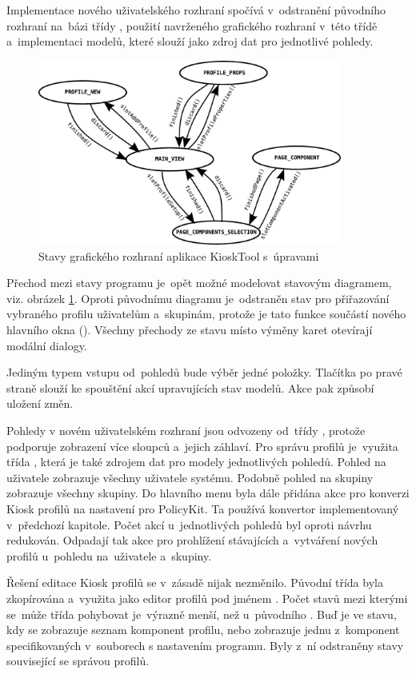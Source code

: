 Implementace nového uživatelského rozhraní spočívá v~odstranění původního rozhraní na~bázi třídy , použití navrženého grafického rozhraní v~této třídě a~implementaci modelů, které slouží jako zdroj dat pro jednotlivé pohledy.

\begin{figure}[h]
    \centering
    \includegraphics[width=10cm]{obrazky/stated-new.pdf}
    \caption{Stavy grafického rozhraní aplikace KioskTool s~úpravami}
    \label{fig:kioskstatesnew}
\end{figure}

Přechod mezi stavy programu je~opět možné modelovat stavovým diagramem, viz. obrázek \ref{fig:kioskstatesnew}. Oproti původnímu diagramu je~odstraněn stav pro přiřazování vybraného profilu uživatelům a~skupinám, protože je tato funkce součástí nového hlavního okna (). Všechny přechody ze stavu  místo výměny karet otevírají modální dialogy.

Jediným typem vstupu od~pohledů bude výběr jedné položky. Tlačítka po pravé straně slouží ke spouštění akcí upravujících stav modelů. Akce  pak způsobí uložení změn.

Pohledy v novém uživatelském rozhraní jsou odvozeny od~třídy , protože podporuje zobrazení více sloupců a~jejich záhlaví. Pro správu profilů je~využita třída , která je také zdrojem dat pro modely jednotlivých pohledů. Pohled na uživatele zobrazuje všechny uživatele systému. Podobně pohled na skupiny zobrazuje všechny skupiny. Do hlavního menu byla dále přidána akce pro konverzi Kiosk profilů na nastavení pro PolicyKit. Ta používá konvertor implementovaný v~předchozí kapitole. Počet akcí u~jednotlivých pohledů byl oproti návrhu redukován. Odpadají tak akce pro prohlížení stávajících a~vytváření nových profilů u~pohledu na~uživatele a~skupiny.

Řešení editace Kiosk profilů se v~zásadě nijak nezměnilo. Původní třída  byla zkopírována a~využita jako editor profilů pod jménem . Počet stavů mezi kterými se~může třída pohybovat je~výrazně menší, než u~původního . Buď je ve stavu, kdy se zobrazuje seznam komponent profilu, nebo zobrazuje jednu z~komponent specifikovaných v~souborech s nastavením programu. Byly z~ní odstraněny stavy související se správou profilů.

